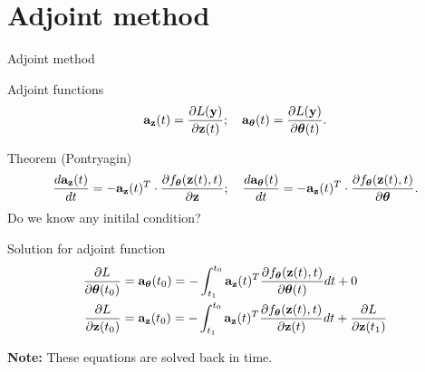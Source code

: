\section{Adjoint method}
\begin{frame}{Adjoint method}
	\vspace{-0.3cm}
	\begin{block}{Adjoint functions}
		\vspace{-0.3cm}
		\[
		\mathbf{a}_{\mathbf{z}}(t) = \frac{\partial L(\mathbf{y})}{\partial \mathbf{z}(t)}; \quad \mathbf{a}_{\boldsymbol{\theta}}(t) = \frac{\partial L(\mathbf{y})}{\partial \boldsymbol{\theta}(t)}.
		\]
		\vspace{-0.6cm}
	\end{block}
	\begin{block}{Theorem (Pontryagin)}
		\vspace{-0.6cm}
		\[
		\frac{d \mathbf{a}_{\mathbf{z}}(t)}{dt} = - \mathbf{a}_{\mathbf{z}}(t)^T \cdot \frac{\partial f_{\boldsymbol{\theta}}(\mathbf{z}(t), t)}{\partial \mathbf{z}}; \quad \frac{d \mathbf{a}_{\boldsymbol{\theta}}(t)}{dt} = - \mathbf{a}_{\mathbf{z}}(t)^T \cdot \frac{\partial f_{\boldsymbol{\theta}}(\mathbf{z}(t),  t)}{\partial \boldsymbol{\theta}}.
		\]
		Do we know any initilal condition?
	\end{block}
	\begin{block}{Solution for adjoint function}
		\vspace{-0.8cm}
		\begin{align*}
			\frac{\partial L}{\partial \boldsymbol{\theta}(t_0)} &= \mathbf{a}_{\boldsymbol{\theta}}(t_0) =  - \int_{t_1}^{t_0} \mathbf{a}_{\mathbf{z}}(t)^T \frac{\partial f_{\boldsymbol{\theta}}(\mathbf{z}(t), t)}{\partial \boldsymbol{\theta}(t)} dt + 0\\
			\frac{\partial L}{\partial \mathbf{z}(t_0)} &= \mathbf{a}_{\mathbf{z}}(t_0) =  - \int_{t_1}^{t_0} \mathbf{a}_{\mathbf{z}}(t)^T \frac{\partial f_{\boldsymbol{\theta}}(\mathbf{z}(t), t)}{\partial \mathbf{z}(t)} dt + \frac{\partial L}{\partial \mathbf{z}(t_1)}\\
		\end{align*}
		\vspace{-1.2cm}
	\end{block}
	\textbf{Note:} These equations are solved back in time.
\end{frame}
